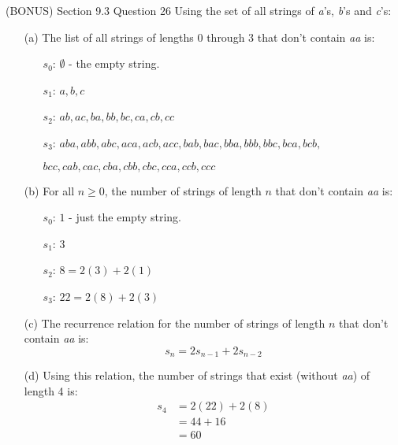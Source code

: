 \documentclass[12pt]{article}
\begin{document}
  \begin{problem}{(BONUS) Section 9.3 Question 26}
    Using the set of all strings of \textit{a}'s, \textit{b}'s and \textit{c}'s:
    \begin{itemize}
      \item[(a)] The list of all strings of lengths 0 through 3 that don't contain \textit{aa} is:
        \begin{itemize}
          \item[$s_0$:] $\emptyset$ - the empty string.
          \item[$s_1$:] $a, b, c$
          \item[$s_2$:] $ab, ac, ba, bb, bc, ca, cb, cc$
          \item[$s_3$:] $aba, abb, abc, aca, acb, acc, bab, bac, bba, bbb, bbc, bca, bcb,$
          \item[] $bcc, cab, cac, cba, cbb, cbc, cca, ccb, ccc$
        \end{itemize}
      \item[(b)] For all $n \geq 0$, the number of strings of length $n$ that don't contain \textit{aa}
        is:
        \begin{itemize}
          \item[$s_0$:] $1$ - just the empty string.
          \item[$s_1$:] $3$
          \item[$s_2$:] $8 = 2(3) + 2(1)$
          \item[$s_3$:] $22 = 2(8) + 2(3)$
        \end{itemize}
      \item[(c)] The recurrence relation for the number of strings of length $n$ that don't contain
        \textit{aa} is:
        \[s_{n} = 2s_{n-1} + 2s_{n-2}\]
      \item[(d)] Using this relation, the number of strings that exist (without \textit{aa}) of length
        4 is:
        \begin{equation*}
          \begin{split}
            s_{4} & = 2(22) + 2(8) \\
              & = 44 + 16 \\
              & = 60
          \end{split}
        \end{equation*}
    \end{itemize}
\end{problem}
\end{document}
